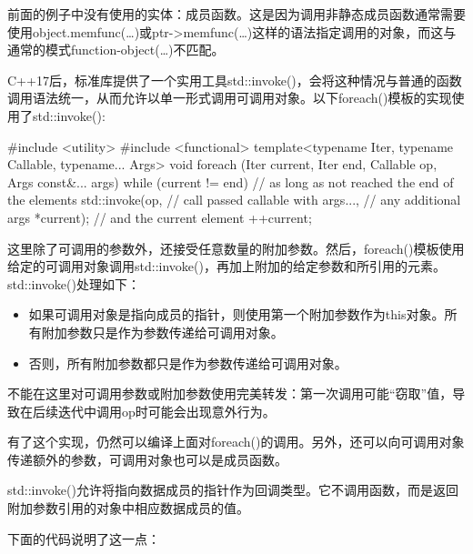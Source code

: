 前面的例子中没有使用的实体：成员函数。这是因为调用非静态成员函数通常需要使用object.memfunc(…)或ptr->memfunc(…)这样的语法指定调用的对象，而这与通常的模式function-object(…)不匹配。

C++17后，标准库提供了一个实用工具std::invoke()，会将这种情况与普通的函数调用语法统一，从而允许以单一形式调用可调用对象。以下foreach()模板的实现使用了std::invoke():

\begin{cpp}
#include <utility>
#include <functional>
template<typename Iter, typename Callable, typename... Args>
void foreach (Iter current, Iter end, Callable op, Args const&... args)
{
	while (current != end) { // as long as not reached the end of the elements
		std::invoke(op, // call passed callable with
					args..., // any additional args
					*current); // and the current element
		++current;
	}
}
\end{cpp}

这里除了可调用的参数外，还接受任意数量的附加参数。然后，foreach()模板使用给定的可调用对象调用std::invoke()，再加上附加的给定参数和所引用的元素。std::invoke()处理如下：

\begin{itemize}
\item
如果可调用对象是指向成员的指针，则使用第一个附加参数作为this对象。所有附加参数只是作为参数传递给可调用对象。

\item
否则，所有附加参数都只是作为参数传递给可调用对象。
\end{itemize}

不能在这里对可调用参数或附加参数使用完美转发：第一次调用可能“窃取”值，导致在后续迭代中调用op时可能会出现意外行为。

有了这个实现，仍然可以编译上面对foreach()的调用。另外，还可以向可调用对象传递额外的参数，可调用对象也可以是成员函数。

\begin{notice}
std::invoke()允许将指向数据成员的指针作为回调类型。它不调用函数，而是返回附加参数引用的对象中相应数据成员的值。
\end{notice}

下面的代码说明了这一点：


